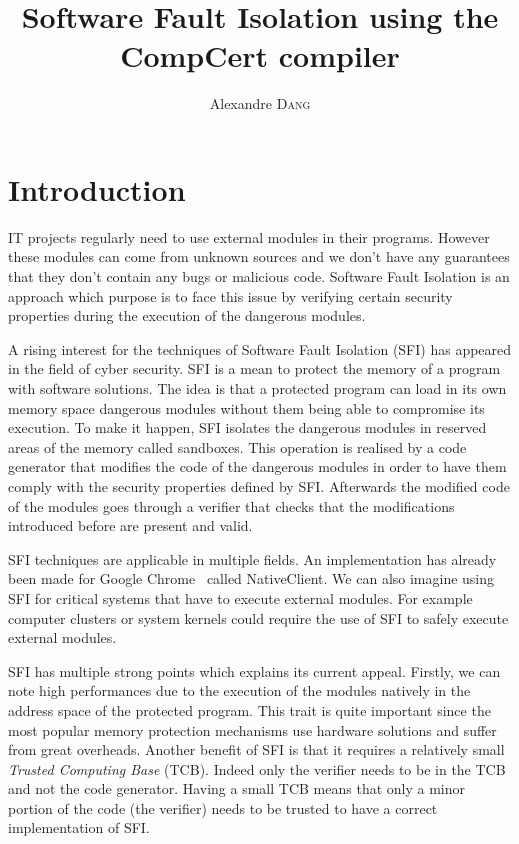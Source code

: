 \documentclass[11pt]{sdm}
\title{Software Fault Isolation using the CompCert compiler}
\author{Alexandre \textsc{Dang}}
\begin{document}
\maketitle


\newpage
\section{Introduction}
IT projects regularly need to use external modules in their programs. However these modules can come from unknown sources and we don't have any guarantees that they don't contain any bugs or malicious code. Software Fault Isolation is an approach which purpose is to face this issue by verifying certain security properties during the execution of the dangerous modules.

A rising interest for the techniques of Software Fault Isolation (SFI) has appeared in the field of cyber security. SFI is a mean to protect the memory of a program with software solutions. 
The idea is that a protected program can load in its own memory space dangerous modules without them being able to compromise its execution.
To make it happen, SFI isolates the dangerous modules in reserved areas of the memory called sandboxes. This operation is realised by a code generator that modifies the code of the dangerous modules in order to have them comply with the security properties defined by SFI. 
Afterwards the modified code of the modules goes through a verifier that checks that the modifications introduced before are present and valid.

SFI techniques are applicable in multiple fields. An implementation has already been made for Google Chrome~\cite{Yee:2010:NCS:1629175.1629203}\cite{Sehr:2010:ASF:1929820.1929822} called NativeClient. We can also imagine using SFI for critical systems that have to execute external modules.
For example computer clusters or system kernels could require the use of SFI to safely execute external modules.

SFI has multiple strong points which explains its current appeal. Firstly, we can note high performances due to the execution of the modules natively in the address space of the protected program. This trait is quite important since the most popular memory protection mechanisms use hardware solutions and suffer from great overheads. Another benefit of SFI is that it requires a relatively small \textit{Trusted Computing Base} (TCB). Indeed only the verifier needs to be in the TCB and not the code generator. Having a small TCB means that only a minor portion of the code (the verifier) needs to be trusted to have a correct implementation of SFI.
\end{document}
